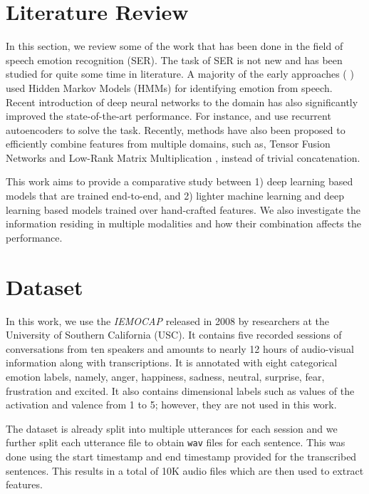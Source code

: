 \documentclass[conference]{IEEEtran}
\begin{document}
\section{Literature Review}
In this section, we review some of the work that has been done in the field of speech emotion recognition (SER). The task of SER is not new and has been studied for quite some time in literature. A majority of the early approaches (\cite{nogueiras2001speech} \cite{schuller2003hidden}) used Hidden Markov Models (HMMs) \cite{rabiner1986introduction} for identifying emotion from speech. Recent introduction of deep neural networks to the domain has also significantly improved the state-of-the-art performance. For instance, \cite{han2014speech} and \cite{kim2013deep} use recurrent autoencoders to solve the task. Recently, methods have also been proposed to efficiently combine features from multiple domains, such as, Tensor Fusion Networks \cite{zadeh2017tensor} and Low-Rank Matrix Multiplication \cite{liu2018efficient}, instead of trivial concatenation.

This work aims to provide a comparative study between 1) deep learning based models that are trained end-to-end, and 2) lighter machine learning and deep learning based models trained over hand-crafted features. We also investigate the information residing in multiple modalities and how their combination affects the performance.

\section{Dataset}
In this work, we use the \textit{IEMOCAP} \cite{busso2008iemocap} released in 2008 by researchers at the University of Southern California (USC). It contains five recorded sessions of conversations from ten speakers and amounts to nearly 12 hours of audio-visual information along with transcriptions. It is annotated with eight categorical emotion labels, namely, anger, happiness, sadness, neutral, surprise, fear, frustration and excited. It also contains dimensional labels such as values of the activation and valence from 1 to 5; however, they are not used in this work.

The dataset is already split into multiple utterances for each session and we further split each utterance file to obtain \texttt{wav} files for each sentence. This was done using the start timestamp and end timestamp provided for the transcribed sentences. This results in a total of 10K audio files which are then used to extract features.
\end{document}
